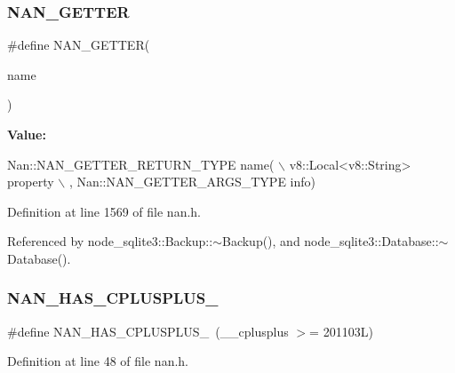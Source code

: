 \mbox{\label{nan_8h_a07f3a9676e4aedec9cb89b3a3315a600}} 
\subsubsection{N\+A\+N\+\_\+\+G\+E\+T\+T\+ER}
{\footnotesize\ttfamily \#define N\+A\+N\+\_\+\+G\+E\+T\+T\+ER(\begin{DoxyParamCaption}\item[{}]{name }\end{DoxyParamCaption})}

{\bfseries Value\+:}
\begin{DoxyCode}
Nan::NAN_GETTER_RETURN_TYPE name(                                          \(\backslash\)
        v8::Local<v8::String> property                                         \(\backslash\)
      , Nan::NAN_GETTER_ARGS_TYPE info)
\end{DoxyCode}


Definition at line 1569 of file nan.\+h.



Referenced by node\+\_\+sqlite3\+::\+Backup\+::$\sim$\+Backup(), and node\+\_\+sqlite3\+::\+Database\+::$\sim$\+Database().

\mbox{\label{nan_8h_a8d06918a4f620872f7ba261efc39bbe7}} 
\subsubsection{N\+A\+N\+\_\+\+H\+A\+S\+\_\+\+C\+P\+L\+U\+S\+P\+L\+U\+S\+\_}
{\footnotesize\ttfamily \#define N\+A\+N\+\_\+\+H\+A\+S\+\_\+\+C\+P\+L\+U\+S\+P\+L\+U\+S\+\_~(\+\_\+\+\_\+cplusplus $>$= 201103\+L)}



Definition at line 48 of file nan.\+h.

\mbox{\label{nan_8h_aab948e9e13e6e31791c46da3329c1721}} 

